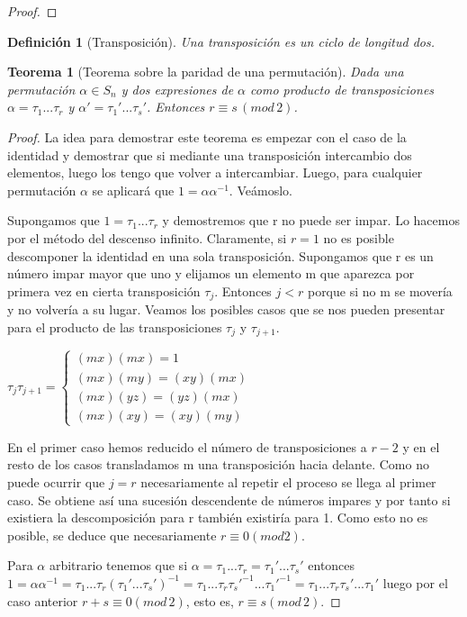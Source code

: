 \documentclass{article}
\theoremstyle{theorem-style}  %
\newtheorem{theorem}{Teorema}[section]  %
\theoremstyle{definition-style}
\newtheorem{definition}{Definición}[section]
\theoremstyle{example-style}
\begin{document}
\begin{proof}

\end{proof}

\begin{definition}[Transposición]
Una transposición es un ciclo de longitud dos.
\end{definition}

\begin{theorem}[Teorema sobre la paridad de una permutación]\label{theorem:paridad-permutacion} 
Dada una permutación $\alpha \in S_n$ y dos expresiones de $\alpha$ como producto de transposiciones $\alpha = \tau_1...\tau_r$ y $\alpha' = \tau_1'...\tau_s'$. Entonces $r \equiv s \, (mod \, 2)$.
\end{theorem}

\begin{proof}
La idea para demostrar este teorema es empezar con el caso de la identidad y demostrar que si mediante una transposición intercambio dos elementos, luego los tengo que volver a intercambiar. Luego, para cualquier permutación $\alpha$ se aplicará que $1 = \alpha\alpha^{-1}$. Veámoslo.

Supongamos que $1 = \tau_1...\tau_r$ y demostremos que r no puede ser impar. Lo hacemos por el método del descenso infinito. Claramente, si $r = 1$ no es posible descomponer la identidad en una sola transposición. Supongamos que r es un número impar mayor que uno y elijamos un elemento m que aparezca por primera vez en cierta transposición $\tau_j$. Entonces $j < r$ porque si no m se movería y no volvería a su lugar. Veamos los posibles casos que se nos pueden presentar para el producto de las transposiciones $\tau_j$ y $\tau_{j+1}$.

$\tau_j\tau_{j+1}=
\begin{cases}
(mx)(mx) = 1 \\
(mx)(my) = (xy)(mx) \\
(mx)(yz) = (yz)(mx) \\
(mx)(xy) = (xy)(my)
\end{cases}$

En el primer caso hemos reducido el número de transposiciones a $r-2$ y en el resto de los casos transladamos m una transposición hacia delante. Como no puede ocurrir que $j = r$ necesariamente al repetir el proceso se llega al primer caso. Se obtiene así una sucesión descendente de números impares y por tanto si existiera la descomposición para r también existiría para 1. Como esto no es posible, se deduce que necesariamente $r \equiv 0 (mod 2)$.

Para $\alpha$ arbitrario tenemos que si $\alpha = \tau_1...\tau_r = \tau_1'...\tau_s'$ entonces $1 = \alpha\alpha^{-1} = \tau_1...\tau_r(\tau_1'...\tau_s')^{-1} = \tau_1...\tau_r\tau_s'^{-1}...\tau_1'^{-1} = \tau_1...\tau_r\tau_s'...\tau_1'$ luego por el caso anterior $r+s \equiv 0 (mod \, 2)$, esto es, $r \equiv s (mod \, 2)$.
\end{proof}
\end{document}
